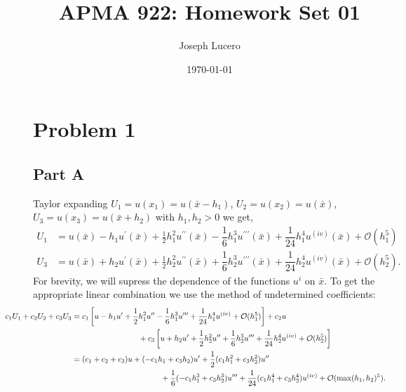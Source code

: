 \documentclass[12pt]{article}
\title{APMA 922: Homework Set 01}
\author{Joseph Lucero}
\date{\today}
\newcommand{\xbar}{\bar{x}}
\newcommand{\bO}{\mathcal{O}}
\begin{document}
\maketitle

\section*{Problem 1}
\subsection*{Part A}
Taylor expanding $U_{1} = u(x_{1}) = u(\xbar-h_{1})$, $ U_{2} = u(x_{2}) = u(\xbar)$, $ U_{3} = u(x_{3}) = u(\xbar+h_{2})$ with $h_{1},h_{2} > 0$ we get,
\begin{align}
    U_{1} &= u(\xbar) - h_{1}u^{\prime}(\xbar) + \frac{1}{2}h_{1}^{2}u^{\prime\prime}(\xbar) - \dfrac{1}{6}h_{1}^{3}u^{\prime\prime\prime}(\xbar)
    + \dfrac{1}{24}h_{1}^{4}u^{(iv)}(\xbar) + \bO(h_{1}^{5})\\
    U_{3} &= u(\xbar) + h_{2}u^{\prime}(\xbar) + \frac{1}{2}h_{2}^{2}u^{\prime\prime}(\xbar) + \dfrac{1}{6}h_{2}^{3}u^{\prime\prime\prime}(\xbar)
    + \dfrac{1}{24}h_{2}^{4}u^{(iv)}(\xbar) + \bO(h_{2}^{5}).
\end{align}
For brevity, we will supress the dependence of the functions $u^{i}$ on $\xbar$. To get the appropriate linear combination we use the method of undetermined coefficients:
\begin{subequations}
    \begin{align}
        \hspace*{-1.25cm}c_{1}U_{1} + c_{2}U_{2} + c_{3}U_{3} &= c_{1}\left[u - h_{1}u^{\prime} + \frac{1}{2}h_{1}^{2}u^{\prime\prime} - \dfrac{1}{6}h_{1}^{3}u^{\prime\prime\prime}
        + \dfrac{1}{24}h_{1}^{4}u^{(iv)} + \bO(h_{1}^{5})\right] + c_{2}u \nonumber\\
        &\hspace{3cm}+ c_{3}\left[u + h_{2}u^{\prime} + \frac{1}{2}h_{2}^{2}u^{\prime\prime} + \dfrac{1}{6}h_{2}^{3}u^{\prime\prime\prime}
        + \dfrac{1}{24}h_{2}^{4}u^{(iv)} + \bO(h_{2}^{5})\right]\\
        &= (c_{1}+c_{2}+c_{3})u
        + (-c_{1}h_{1}+c_{3}h_{2})u^{\prime} + \frac{1}{2}(c_{1}h_{1}^{2}+c_{3}h_{2}^{2})u^{\prime\prime} \nonumber\\
        &\hspace{4cm} + \frac{1}{6}(-c_{1}h_{1}^{3}+c_{3}h_{2}^{3})u^{\prime\prime\prime} + \frac{1}{24}(c_{1}h_{1}^{4}+c_{3}h_{2}^{4})u^{(iv)}
        + \bO(\max(h_{1},h_{2})^{5}).
    \end{align}
\end{subequations}
\end{document}
